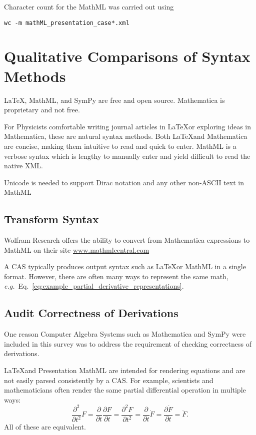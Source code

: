 \documentclass{article}
\newcommand{\eg}{\textit{e.g.}} %
\begin{document}
\begin{multicols}{2}

Character count for the MathML was carried out using
\begin{verbatim}
wc -m mathML_presentation_case*.xml
\end{verbatim}

\section{Qualitative Comparisons of Syntax Methods\label{sec:qual_compare}}
\LaTeX, MathML, and SymPy are free and open source. Mathematica is proprietary and not free.

For Physicists comfortable writing journal articles in \LaTeX or exploring ideas in Mathematica, these are natural syntax methods. Both \LaTeX and Mathematica are concise, making them intuitive to read and quick to enter. MathML is a verbose syntax which is lengthy to manually enter and yield difficult to read the native XML.  

Unicode is needed to support Dirac notation and any other non-ASCII text in MathML

\subsection{Transform Syntax\label{sec:transform}}

Wolfram Research offers the ability to convert from Mathematica expressions to MathML on their site \href{http://www.mathmlcentral.com/Tools/ToMathML.jsp}{www.mathmlcentral.com}

A CAS typically produces output syntax such as \LaTeX or MathML in a single format. However, there are often many ways to represent the same math,  \eg~Eq.~\ref{eq:example_partial_derivative_representations}.

\subsection{Audit Correctness of Derivations\label{sec:audit_correctness}}

One reason Computer Algebra Systems such as Mathematica and SymPy were included in this survey was to address the requirement of checking correctness of derivations. 

\LaTeX and Presentation MathML are intended for rendering equations and are not easily parsed consistently by a CAS. For example, scientists and mathematicians often render the same partial differential operation in multiple ways:
\begin{equation}
\frac{\partial^2}{\partial t^2}F =\frac{\partial}{\partial t}\frac{\partial F}{\partial t} = \frac{\partial^2 F}{\partial t^2} = \frac{\partial}{\partial t}\dot{F} = \frac{\partial \dot{F}}{\partial t} = \ddot{F}.
\label{eq:example_partial_derivative_representations}
\end{equation}
All of these are equivalent. 


\end{multicols}
\end{document}
